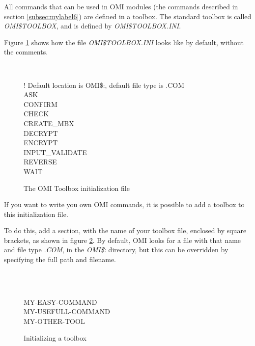 \documentclass[a4paper]{book}
\newcommand{\vs}{\vspace{3mm}}
\renewcommand{\indent}{\hspace*{5mm}}
\begin{document}
All commands that can be used in OMI modules (the commands described in 
section \ref{subsec:mylabel6}) are defined in a toolbox. The standard toolbox is called 
\linebreak\textsl{OMI{\$}TOOLBOX}, and is defined by \textsl{OMI{\$}TOOLBOX.INI}.

Figure \ref{fig:toolboxini} shows how the file \textsl{OMI{\$}TOOLBOX.INI} looks like by default, 
without the comments.

\begin{figure}[h!tb]
\begin{minipage}[h!tb]{\textwidth}
\hrulefill \\
\begin{small}
\begin{ttfamily}
 ! Default location is OMI{\$}:, default file type is .COM \\
\indent ASK \\
\indent CONFIRM \\
\indent CHECK \\
\indent CREATE{\_}MBX \\
\indent DECRYPT \\
\indent ENCRYPT \\
\indent INPUT{\_}VALIDATE \\
\indent REVERSE \\
\indent WAIT \\
\end{ttfamily}
\end{small}
\caption{The OMI Toolbox initialization file}\label{fig:toolboxini}
\hrulefill
\end{minipage}
\end{figure}

\vs

If you want to write you own OMI commands, it is possible to add a toolbox 
to this initialization file.

To do this, add a section, with the name of your toolbox file, enclosed by 
square brackets, as shown in figure \ref{fig:toolboxadd}. By default, OMI looks for a file 
with that name and file type \textsl{.COM}, in the \textsl{OMI{\$}:} directory, but this can be 
overridden by specifying the full path and filename.

\begin{figure}[h!tb]
\begin{minipage}[h!tb]{\textwidth}
\hrulefill \\
\begin{ttfamily}
\noindent[MY{\_}TOOLBOX] \\
\indent MY-EASY-COMMAND \\
\indent MY-USEFULL-COMMAND \\
\indent MY-OTHER-TOOL \\
\end{ttfamily}
\caption{Initializing a toolbox}\label{fig:toolboxadd}
\hrulefill
\end{minipage}
\end{figure}
\end{document}
